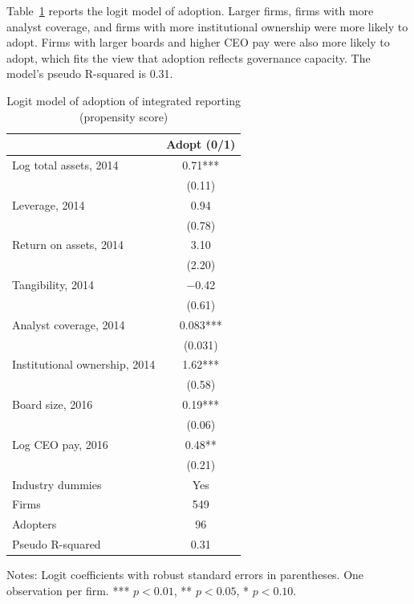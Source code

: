 \documentclass[11pt]{article}
\begin{document}
Table~\ref{tab:score} reports the logit model of adoption. Larger firms, firms with more analyst coverage, and firms with more institutional ownership were more likely to adopt. Firms with larger boards and higher CEO pay were also more likely to adopt, which fits the view that adoption reflects governance capacity. The model's pseudo R-squared is 0.31.

\begin{table}[!htbp]
\centering
\begin{threeparttable}
\caption{Logit model of adoption of integrated reporting (propensity score)}
\label{tab:score}
\small
\begin{tabular}{lc}
\toprule
 & Adopt (0/1) \\
\midrule
Log total assets, 2014 & 0.71*** \\
 & (0.11) \\
Leverage, 2014 & 0.94 \\
 & (0.78) \\
Return on assets, 2014 & 3.10 \\
 & (2.20) \\
Tangibility, 2014 & $-$0.42 \\
 & (0.61) \\
Analyst coverage, 2014 & 0.083*** \\
 & (0.031) \\
Institutional ownership, 2014 & 1.62*** \\
 & (0.58) \\
Board size, 2016 & 0.19*** \\
 & (0.06) \\
Log CEO pay, 2016 & 0.48** \\
 & (0.21) \\
Industry dummies & Yes \\
\midrule
Firms & 549 \\
Adopters & 96 \\
Pseudo R-squared & 0.31 \\
\bottomrule
\end{tabular}
\begin{tablenotes}\footnotesize
\item Notes: Logit coefficients with robust standard errors in parentheses. One observation per firm. *** $p<0.01$, ** $p<0.05$, * $p<0.10$.
\end{tablenotes}
\end{threeparttable}
\end{table}
\end{document}
